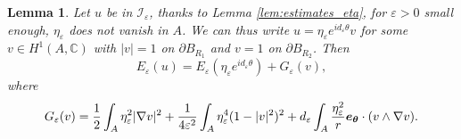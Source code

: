 \documentclass[12pt,reqno]{amsart}
\newtheorem{lemma}[theorem]{Lemma}
\def\I{{\mathcal I}}
\def\e {{\varepsilon}}
\renewcommand{\vec}[1]{\text{\boldmath $#1$}}
\def \p {\partial}
\numberwithin{equation}{section}
\begin{document}
\begin{lemma}\label{lem:decomposition_energy} 
Let \(u\) be in \(\I_\e\), thanks to Lemma \ref{lem:estimates_eta}, for \(\e>0\) small enough, \(\eta_\e\) does not vanish in \(A\). We can thus write \(u=\eta_\e e^{id_\e\theta} v\) for some \(v\in H^1(A,\mathbb{C})\) with \(|v|=1\) on \(\p B_{R_1}\) and \(v=1\) on \(\p B_{R_2}\). Then
\begin{equation}\label{eq:splittinh}
E_\e(u)=E_\e(\eta_\e e^{id_\e \theta})+G_\e(v),
\end{equation} 
where 
\begin{equation*}
G_\e(v)=\frac12 \int_A \eta_\e^2 |\nabla v|^2+\frac{1}{4\e^2}\int_A \eta_\e^4 (1-|v|^2)^2 +d_\e\int_A \frac{\eta_\e^2}{r}\vec{e_\theta}\cdot (v\wedge \nabla v).
\end{equation*}
\end{lemma}
\end{document}
